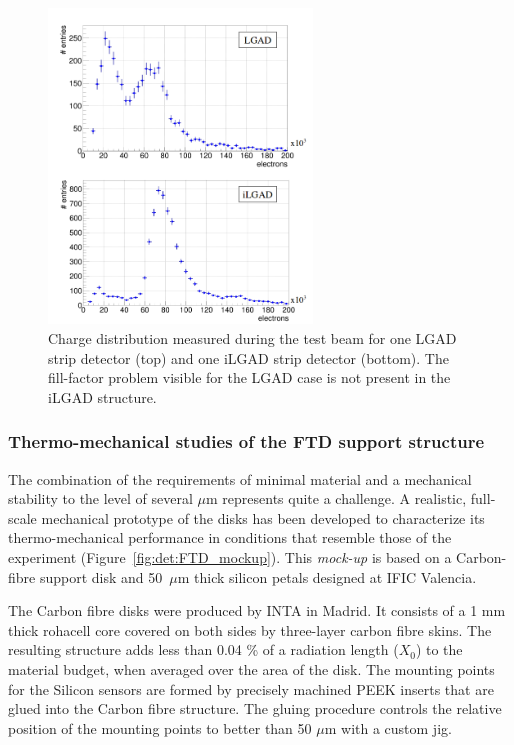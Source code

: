 \begin{figure}[t]
\centering
\includegraphics[width=7cm]{Detector/fig/fill-factor.png}
\caption{Charge distribution measured during the test beam for one LGAD strip detector (top) and one iLGAD strip detector (bottom). The fill-factor problem visible for the LGAD case is not present in the iLGAD structure.} 
\label{fig:det:fill-factor}
\centering
\end{figure}


\subsubsection{Thermo-mechanical studies of the FTD support structure}

The combination of the requirements of minimal material and a mechanical stability to 
the level of several $\mu\mathrm{m}$ represents quite a challenge. A realistic, 
full-scale mechanical prototype of the disks has been developed to characterize 
its thermo-mechanical performance 
in conditions that resemble those of the experiment (Figure~\ref{fig:det:FTD_mockup}). 
This {\em mock-up} is based on a Carbon-fibre support disk
and 50~$\mu\mathrm{m}$ thick silicon petals designed at IFIC Valencia. 

The Carbon fibre disks were produced by INTA in Madrid. It consists of
a 1 mm thick rohacell core covered on both sides by three-layer carbon fibre skins. The resulting structure adds less than 0.04 \% of a radiation length ($X_0$) to the material budget, when averaged over the area of the disk. The mounting points for the Silicon sensors are formed by precisely machined 
PEEK inserts that are glued into the Carbon fibre structure. The gluing procedure controls the relative position of the mounting points to better than 50 $\mu \mathrm{m}$ with a custom jig. 

